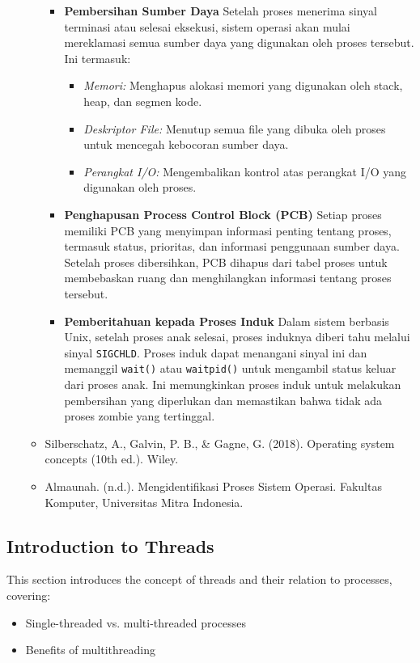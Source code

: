 \documentclass[12pt]{article}
\begin{document}
\begin{itemize}
\begin{itemize}
\begin{itemize}
        \item \textbf{Pembersihan Sumber Daya}  
        Setelah proses menerima sinyal terminasi atau selesai eksekusi, sistem operasi akan mulai mereklamasi semua sumber daya yang digunakan oleh proses tersebut. Ini termasuk:
        \begin{itemize}
            \item \textit{Memori:} Menghapus alokasi memori yang digunakan oleh stack, heap, dan segmen kode.
            \item \textit{Deskriptor File:} Menutup semua file yang dibuka oleh proses untuk mencegah kebocoran sumber daya.
            \item \textit{Perangkat I/O:} Mengembalikan kontrol atas perangkat I/O yang digunakan oleh proses.
        \end{itemize}
        
        \item \textbf{Penghapusan Process Control Block (PCB)}  
        Setiap proses memiliki PCB yang menyimpan informasi penting tentang proses, termasuk status, prioritas, dan informasi penggunaan sumber daya. Setelah proses dibersihkan, PCB dihapus dari tabel proses untuk membebaskan ruang dan menghilangkan informasi tentang proses tersebut.
        
        \item \textbf{Pemberitahuan kepada Proses Induk}  
        Dalam sistem berbasis Unix, setelah proses anak selesai, proses induknya diberi tahu melalui sinyal \texttt{SIGCHLD}. Proses induk dapat menangani sinyal ini dan memanggil \texttt{wait()} atau \texttt{waitpid()} untuk mengambil status keluar dari proses anak. Ini memungkinkan proses induk untuk melakukan pembersihan yang diperlukan dan memastikan bahwa tidak ada proses zombie yang tertinggal.
    \end{itemize}
    \item {Silberschatz, A., Galvin, P. B., & Gagne, G. (2018). Operating system concepts (10th ed.). Wiley.}
    \item {Almaunah. (n.d.). Mengidentifikasi Proses Sistem Operasi. Fakultas Komputer, Universitas  Mitra Indonesia.}
    \end{itemize}
\end{itemize}

\subsection{Introduction to Threads}
This section introduces the concept of threads and their relation to processes, covering:
\begin{itemize}
    \item Single-threaded vs. multi-threaded processes
    \item Benefits of multithreading
\end{itemize}
\end{document}
